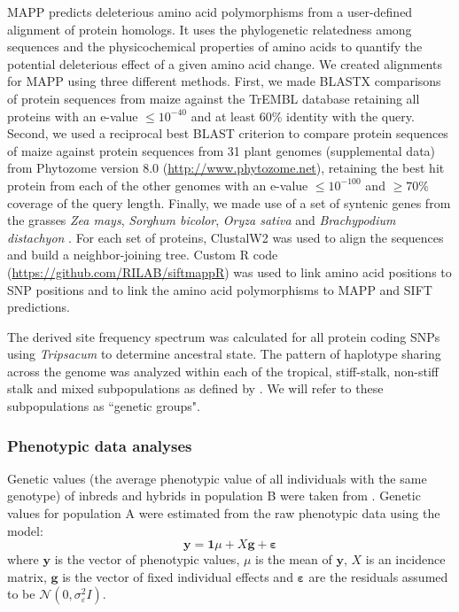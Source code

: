 \documentclass[12pt]{article}
\begin{document}
MAPP predicts deleterious amino acid polymorphisms from a user-defined alignment of protein homologs. It uses the phylogenetic relatedness among sequences and the physicochemical properties of amino acids to quantify the potential deleterious effect of a given amino acid change.  We created alignments for MAPP using three different methods.  First, we made BLASTX comparisons of protein sequences from maize against the TrEMBL database \citep{Boeckmann2003} retaining all proteins with an e-value $\leq 10^{-40}$ and at least 60\% identity with the query.  Second, we used a reciprocal best BLAST criterion to compare protein sequences of maize against protein sequences from 31 plant genomes (supplemental data)  from Phytozome version 8.0 (\url{http://www.phytozome.net}), retaining the best hit protein from each of the other genomes with an e-value $\leq 10^{-100}$ and  $\geq 70\%$ coverage of the query length. Finally, we made use of a set of syntenic genes from the grasses \emph{Zea mays}, \emph{Sorghum bicolor}, \emph{Oryza sativa} and \emph{Brachypodium distachyon}  \citep{Schnable2012}. For each set of proteins, ClustalW2 \citep{Larkin2007} was used to align the sequences and build a neighbor-joining tree. Custom R code (\url{https://github.com/RILAB/siftmappR}) was used to link amino acid positions to SNP positions and to link the amino acid polymorphisms to MAPP and SIFT predictions.

The derived site frequency spectrum was calculated for all protein coding SNPs using \emph{Tripsacum} \citep{Chia2012} to determine ancestral state. 
The pattern of haplotype sharing across the genome \citep[PHS statistics;][]{Toomajian2006} was analyzed within each of the tropical, stiff-stalk, non-stiff stalk and mixed subpopulations as defined by \citet{Flint-Garcia2005}. We will refer to these subpopulations as ``genetic groups".

\subsubsection*{Phenotypic data analyses}

Genetic values (the average phenotypic value of all individuals with the same genotype) of inbreds and hybrids in population B were taken from \citet{Flint-Garcia2009}. 
Genetic values for population A were estimated from the raw phenotypic data using the model:
%
\[\mathbf{y}=\mathbf{1}\mu +X\mathbf{g}+\mathbf{\varepsilon} \]
%
where $\mathbf{y}$ is the vector of phenotypic values, $\mu$ is the mean of $\mathbf{y}$, $X$ is an incidence matrix, $\mathbf{g}$ is the vector of fixed individual effects and $\mathbf{\varepsilon}$ are the residuals assumed to be $\mathcal{N}(0,\sigma _{\varepsilon }^{2}I)$.
\end{document}
